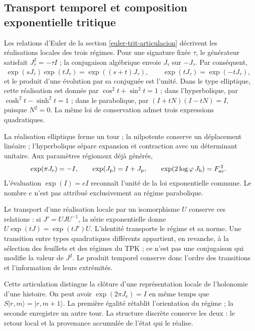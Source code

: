 

\subsection{Transport temporel et composition exponentielle tritique}
\label{mono-ampl:euler}

Les relations d'Euler de la section \ref{euler-trit-articulacion}
décrivent les réalisations locales des trois régimes. Pour une signature
fixée \(\tau\), le générateur satisfait \(J_\tau^2=-\tau I\) ;
la conjugaison algébrique envoie \(J_\tau\) sur \(-J_\tau\). Par conséquent,
\[
 \exp(sJ_\tau)\exp(tJ_\tau)=\exp((s+t)J_\tau),\qquad
 \overline{\exp(tJ_\tau)}=\exp(-tJ_\tau),
\]
et le produit d'une évolution par sa conjuguée est l'unité. Dans le type
elliptique, cette réalisation est donnée par \(\cos^2t+\sin^2t=1\) ; dans l'hyperbolique,
par \(\cosh^2t-\sinh^2t=1\) ; dans le parabolique,
par \((I+tN)(I-tN)=I\), puisque \(N^2=0\). La même loi de conservation
admet trois expressions quadratiques.

La réalisation elliptique ferme un tour ; la nilpotente conserve un
déplacement linéaire ; l'hyperbolique sépare expansion et contraction avec
un déterminant unitaire. Aux paramètres régionaux déjà générés,
\[
 \exp(\pi J_{\mathrm e})=-I,\qquad
 \exp(J_{\mathrm p})=I+J_{\mathrm p},\qquad
 \exp(2\log\varphi\,J_{\mathrm h})=F_{\rm av}^{\,2}.
\]
L'évaluation \(\exp(I)=eI\) reconnaît l'unité de la loi exponentielle
commune. Le nombre \(e\) n'est pas attribué exclusivement au régime parabolique.

Le transport d'une réalisation locale par un isomorphisme \(U\) conserve
ces relations : si \(J'=UJU^{-1}\), la série exponentielle donne
\(U\exp(tJ)=\exp(tJ')U\). L'identité transporte le régime et sa
norme. Une transition entre types quadratiques différents appartient, en
revanche, à la sélection des feuillets et des régimes du TPK ; ce n'est pas une conjugaison
qui modifie la valeur de \(J^2\). Le produit temporel conserve donc
l'ordre des transitions et l'information de leurs extrémités.

Cette articulation distingue la clôture d'une représentation locale de
l'holonomie d'une histoire. On peut avoir \(\exp(2\pi J_{\mathrm e})=I\)
en même temps que \(S|r,m\rangle=|r,m+1\rangle\). La première égalité
rétablit l'orientation du régime ; la seconde enregistre un autre tour. La
structure discrète conserve les deux : le retour local et la provenance
accumulée de l'état qui le réalise.
